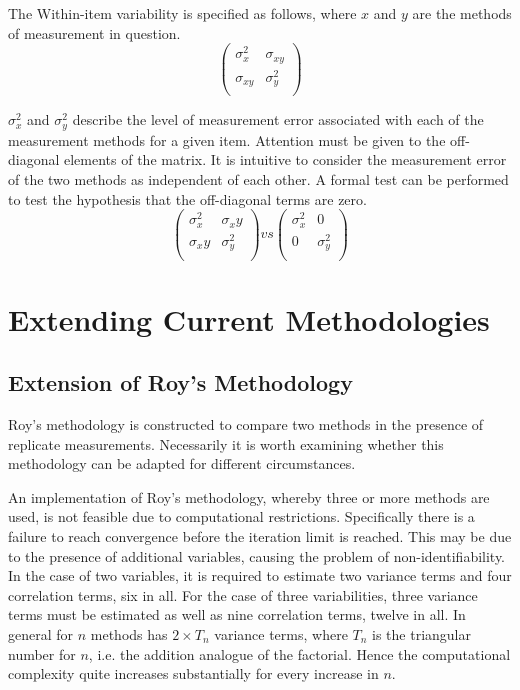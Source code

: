 \documentclass[12pt, a4paper]{report}
\theoremstyle{plain}
\theoremstyle{definition}
\theoremstyle{remark}
\begin{document}
The Within-item variability is specified as follows, where $x$ and $y$ are the methods of measurement in question.
\[ \left(
\begin{array}{cc}
\sigma^2_x & \sigma_{xy} \\
\sigma_{xy} & \sigma^2_y \\
\end{array}
\right)
\]

$\sigma^2_x$ and $\sigma^2_y$ describe the level of measurement error associated with each of the measurement methods for a given item. Attention must be given to the off-diagonal elements of the matrix. It is intuitive to consider the measurement error of the two methods as independent of each other. A formal test can be performed to test the hypothesis that the off-diagonal terms are zero.
\[ \left(
\begin{array}{cc}
\sigma^2_x & \sigma_xy \\
\sigma_xy & \sigma^2_y \\
\end{array}
\right) vs \left(
\begin{array}{cc}
\sigma^2_x & 0 \\
0 & \sigma^2_y \\
\end{array}
\right)
\]


\chapter{Extending Current Methodologies}
\section{Extension of Roy's Methodology}
Roy's methodology is constructed to compare two methods in the presence of replicate measurements. Necessarily it is worth examining whether this methodology can be adapted for different circumstances.

An implementation of Roy's methodology, whereby three or more methods are used, is not feasible due to computational restrictions. Specifically there is a failure to reach convergence before the iteration limit is reached. This may be due to the presence of additional variables, causing the problem of non-identifiability. In the case of two variables, it is required to estimate two variance terms and four correlation terms, six in all. For the case of three variabilities, three variance terms must be estimated as well as nine correlation terms, twelve in all. In general for $n$ methods has $2 \times T_{n}$ variance terms, where $T_n$ is the triangular number for $n$, i.e. the addition analogue of the factorial. Hence the computational complexity quite increases substantially for every increase in $n$.
\end{document}
